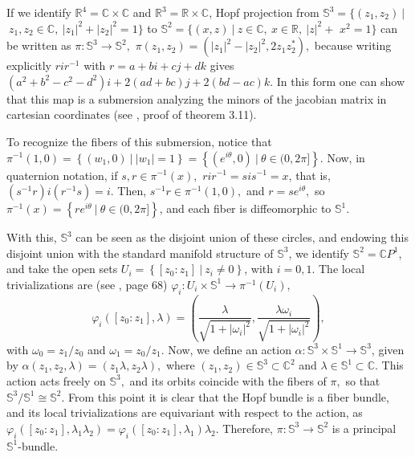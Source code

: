 \documentclass[12pt, letterpaper, reqno]{amsart}
\theoremstyle{definition}
\theoremstyle{plain}
\theoremstyle{remark}
\begin{document}
	If we identify $ \mathbb{R}^4=\mathbb{C}\times \mathbb{C} $ and $ \mathbb{R}^3= \mathbb{R}\times\mathbb{C}  $, Hopf projection from $ \mathbb{S}^3= \{ (z_1,z_2)\  |$ $ \ z_1,z_2\in \mathbb{C}, \ |z_1|^2+|z_2|^2=1 \} $ to $ \mathbb{S}^2 = \{ (x,z)\ | \ z\in \mathbb{C},\ x\in \mathbb{R},\ |z|^2+$ $x^2=1 \} $  can be written as $ \pi: \mathbb{S}^3 \rightarrow { \mathbb{S}^2},$ $ \pi(z_1,z_2) =(|z_1|^2-|z_2|^2, 2z_1z_2^* ),$ because writing explicitly $ rir^{-1} $ with $ r=a+bi+cj+dk $ gives $ (a^2+b^2-c^2-d^2)i+2(ad+bc)j+2(bd-ac)k. $    In this form one can show that this map is a submersion analyzing the minors of the jacobian matrix in cartesian coordinates (see \cite{linintroductory}, proof of theorem 3.11).

	To recognize the fibers of this submersion, notice that $ \pi^{-1}(1,0) = \left\{ (w_1,0) \ | \ |w_1| =1 \right\} = \left\{ (e^{i\theta},0) \ | \ \theta\in (0,2\pi]  \right\} $. Now, in quaternion notation, if $ s,r\in \pi^{-1}(x), $ $ rir^{-1} = sis^{-1}=x $, that is, $ (s^{-1}r)i(r^{-1}s) = i $. Then, $ s^{-1}r \in \pi^{-1}(1,0), $ and $ r= se^{i\theta}, $ so $ \pi^{-1}(x) = \left\{ re^{i\theta}\ | \ \theta\in (0,2\pi] \right\} $, and each fiber is diffeomorphic to $ \mathbb{S}^1. $        

	With this, $ \mathbb{S}^3 $ can be seen as the disjoint union of these circles, and endowing this disjoint union with the standard manifold structure of $ \mathbb{S}^3 $, we identify $ \mathbb{S}^2 = \mathbb{C}P^1$, and take the open sets $ U_i= \left\{ \left[ z_0 : z_1 \right]\ | \ z_i\neq 0 \right\}$, with $ i=0,1. $ The local trivializations are (see \cite{luke2013vector}, page 68) $ \varphi_i: U_i \times \mathbb{S}^1 \rightarrow \pi^{-1}(U_i), $ $$ \varphi_i([z_0:z_1], \lambda) = \left( \frac{\lambda}{\sqrt{1+|\omega_i|^2}}, \frac{\lambda\omega_i}{\sqrt{1+|\omega_i|^2}}   \right), $$ with $ \omega_0=z_1/z_0 $ and $ \omega_1 = z_0/z_1. $ Now, we define an action $ \alpha: \mathbb{S}^3\times \mathbb{S}^1 \rightarrow { \mathbb{S}^3}
	$, given by $ \alpha(z_1,z_2,\lambda) = (z_1\lambda, z_2\lambda), $ where $ (z_1,z_2)\in \mathbb{S}^3\subset \mathbb{C}^2 $ and $ \lambda\in \mathbb{S}^1 \subset \mathbb{C}. $ This action acts freely on $ \mathbb{S}^3, $ and its orbits coincide with the fibers of $ \pi, $ so that $ \mathbb{S}^3/ \mathbb{S}^1 \cong \mathbb{S}^2. $ From this point it is clear that the Hopf bundle is a fiber bundle, and its local trivializations are equivariant with respect to the action, as $ \varphi_i([z_0:z_1], \lambda_1\lambda_2) = \varphi_i([z_0:z_1], \lambda_1)\lambda_2. $ Therefore, $ \pi: \mathbb{S}^3 \rightarrow { \mathbb{S}^2} $ is a principal $ \mathbb{S}^1$-bundle.
\end{document}
